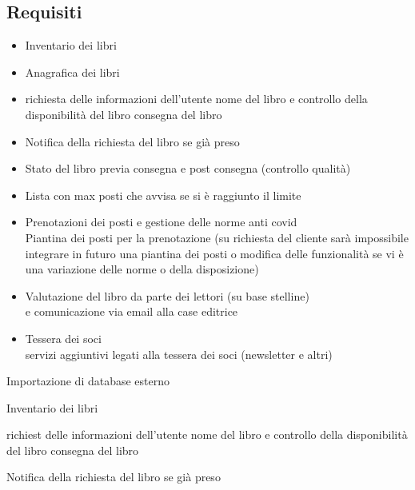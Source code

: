 \documentclass{tstextbook}
\begin{document}
\subsection{Requisiti}	
\begin{itemize}
	\item Inventario dei libri 
 	\item Anagrafica dei libri 
 	\item richiesta delle informazioni dell'utente
	nome del libro e controllo della disponibilità del libro
	consegna del libro
	\item Notifica della richiesta del libro se già preso 
	\item Stato del libro previa consegna e post consegna (controllo qualità)
	\item Lista con max posti che avvisa se si è raggiunto il limite \\
	\item Prenotazioni dei posti e gestione delle norme anti covid\\
	Piantina dei posti per la prenotazione (su richiesta del cliente sarà impossibile integrare in futuro una piantina dei posti o modifica delle funzionalità se vi è una variazione delle norme o della disposizione)\\
	\item Valutazione del libro da parte dei lettori (su base stelline)\\
	e comunicazione via email alla case editrice
	\item Tessera dei soci\\
	servizi aggiuntivi legati alla tessera dei soci (newsletter e altri)\\
	


\end{itemize}














Importazione di database esterno

Inventario dei libri 
 




richiest delle informazioni dell'utente
nome del libro e controllo della disponibilità del libro
consegna del libro

Notifica della richiesta del libro se già preso 
\end{document}
